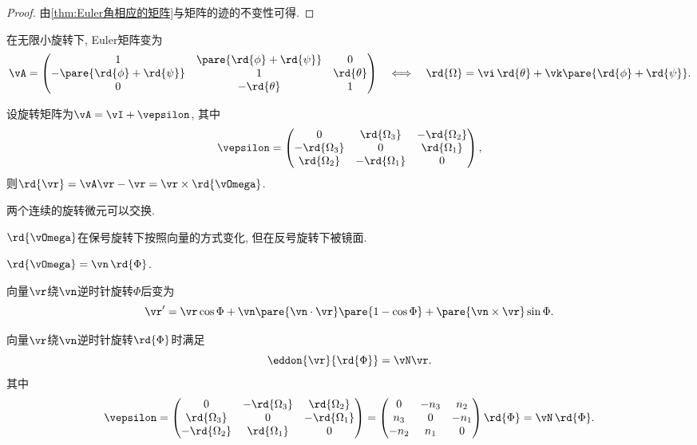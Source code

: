 \documentclass[../TheoreticalMechanics.tex]{subfiles}
\begin{document}
\begin{proof}
    由\cref{thm:Euler角相应的矩阵}与矩阵的迹的不变性可得.
\end{proof}
\begin{lemma}[无限小旋转的Euler矩阵]
    \label{lem:无限小旋转的Euler矩阵}
    在无限小旋转下, Euler矩阵变为
    \[ \vA = \begin{pmatrix}
        1 & \pare{\rd{\phi} + \rd{\psi}} & 0 \\
        -\pare{\rd{\phi} + \rd{\psi}} & 1 & \rd{\theta} \\
        0 & -\rd{\theta} & 1
    \end{pmatrix}\quad \Longleftrightarrow \quad \rd{\Omega} = \vi\,\rd{\theta} + \vk\pare{\rd{\phi} + \rd{\psi}}. \]
\end{lemma}
\begin{lemma}[一般旋转微元]
    设旋转矩阵为$\vA = \vI + \vepsilon$, 其中
    \[ \vepsilon = \begin{pmatrix}
        0 & \rd{\Omega_3} & -\rd{\Omega_2} \\
        -\rd{\Omega_3} & 0 & \rd{\Omega_1} \\
        \rd{\Omega_2} & -\rd{\Omega_1} & 0
    \end{pmatrix}, \]
    则$\rd{\vr} = \vA\vr - \vr = \vr\times\rd{\vOmega}$.
\end{lemma}
\begin{finale}
    \begin{corollary}[微小旋转可交换]
        两个连续的旋转微元可以交换.
    \end{corollary}
\end{finale}
\begin{remark}
    $\rd{\vOmega}$在保号旋转下按照向量的方式变化, 但在反号旋转下被镜面.
\end{remark}
\begin{corollary}[旋转微元的几何意义]
    $\rd{\vOmega} = \vn\,\rd{\Phi}$.
\end{corollary}
\begin{lemma}[向量旋转的表示]
    向量$\vr$绕$\vn$逆时针旋转$\Phi$后变为
    \[ \vr' = \vr\cos\Phi + \vn\pare{\vn\cdot\vr}\pare{1-\cos\Phi} + \pare{\vn\times\vr}\sin\Phi. \]
\end{lemma}
\begin{lemma}[向量的旋转微元表示]
    向量$\vr$绕$\vn$逆时针旋转$\rd{\Phi}$时满足
    \[ \eddon{\vr}{\rd{\Phi}} = \vN \vr. \]
    其中
    \[ \vepsilon = \begin{pmatrix}
        0 & -\rd{\Omega_3} & \rd{\Omega_2} \\
        \rd{\Omega_3} & 0 & -\rd{\Omega_1} \\
        -\rd{\Omega_2} & \rd{\Omega_1} & 0
    \end{pmatrix} = \begin{pmatrix}
        0 & -n_3 & n_2 \\
        n_3 & 0 & -n_1 \\
        -n_2 & n_1 & 0
    \end{pmatrix}\rd{\Phi} = \vN\,\rd{\Phi}. \]
\end{lemma}
\end{document}
